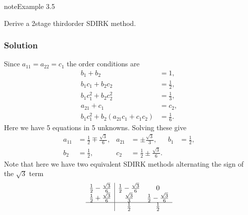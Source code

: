 \documentclass[letterpaper,10pt,english]{jupyterBook}
\begin{document}
\begin{sphinxadmonition}{note}{Example 3.5}

\sphinxAtStartPar
Derive a 2\sphinxhyphen{}stage third\sphinxhyphen{}order SDIRK method.
\subsubsection*{Solution}

\sphinxAtStartPar
Since \(a_{11} = a_{22} = c_1\) the order conditions are
\begin{align*}
    b_1 +b_2  & =1,\\
    b_1 c_1 +b_2 c_2  & =\frac{1}{2},\\
    b_1 c_1^2 +b_2 c_2^2  & =\frac{1}{3},\\
    a_{21} +c_1  & =c_2 ,\\
    b_1 c_1^2 +b_2 (a_{21} c_1 +c_1 c_2 ) & =\frac{1}{6}.
\end{align*}
\sphinxAtStartPar
Here we have 5 equations in 5 unknowns. Solving these give
\begin{align*}
  a_{11} &= \frac{1}{2} \mp \frac{\sqrt{3}}{6}, &
  a_{21} &= \pm \frac{\sqrt{3}}{3},  &
  b_1 &= \frac{1}{2}, \\
  b_2 &= \frac{1}{2},  &
  c_2 &= \frac{1}{2} \pm \frac{\sqrt{3}}{6}.
\end{align*}
\sphinxAtStartPar
Note that here we have two equivalent SDIRK methods alternating the sign of the \(\sqrt{3}\) term
\begin{align*}
  \begin{array}{c|cc}
     \frac{1}{2} - \frac{\sqrt{3}}{6} & \frac{1}{2} - \frac{\sqrt{3}}{6} & 0 \\
     \frac{1}{2} + \frac{\sqrt{3}}{6} & \frac{\sqrt{3}}{3} & \frac{1}{2} - \frac{\sqrt{3}}{6} \\ \hline
     & \frac{1}{2} & \frac{1}{2}
  \end{array}
\end{align*}\end{sphinxadmonition}

\sphinxstepscope
\end{document}
